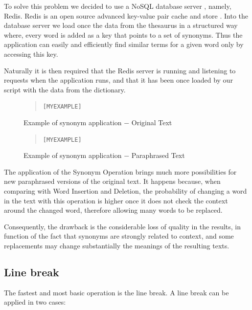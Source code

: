 \documentclass[11pt]{reportAlternative}
\begin{document}
To solve this problem we decided to use a NoSQL database server \cite{NoSQL}, namely, Redis. Redis is an open source advanced key-value pair cache and store \cite{Redis}. Into the database server we load once the data from the thesaurus in a structured way where, every word is added as a key that points to a set of synonyms. Thus the application can easily and efficiently find similar terms for a given word only by accessing this key.

Naturally it is then required that the Redis server is running and listening to requests when the application runs, and that it has been once loaded by our script with the data from the dictionary.

\begin{figure}[H]
\begin{quote}
\begin{alltt}
[MY EXAMPLE]
\end{alltt}
\end{quote}
\caption{Example of synonym application $-$ Original Text}
\end{figure}

\begin{figure}[H]
\begin{quote}
\begin{alltt}
[MY EXAMPLE]
\end{alltt}
\end{quote}
\caption{Example of synonym application $-$ Paraphrased Text}
\end{figure}

The application of the Synonym Operation brings much more possibilities for new paraphrased versions of the original text. It happens because, when comparing with Word Insertion and Deletion, the probability of changing a word in the text with this operation is higher once it does not check the context around the changed word, therefore allowing many words to be replaced.

Consequently, the drawback is the considerable loss of quality in the results, in function of the fact that synonyms are strongly related to context, and some replacements may change substantially the meanings of the resulting texts.

\subsection{Line break}
The fastest and most basic operation is the line break. A line break can be applied in two cases:
\end{document}
